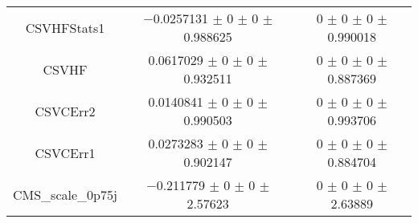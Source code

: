 \begin{table}
\begin{tabular}{ccc}
CSVHFStats1 & \num{-0.0257131} $\pm$ \num{0} $\pm$ \num{0} $\pm$ \num{0.988625} & \num{0} $\pm$ \num{0} $\pm$ \num{0} $\pm$ \num{0.990018}\\
CSVHF & \num{0.0617029} $\pm$ \num{0} $\pm$ \num{0} $\pm$ \num{0.932511} & \num{0} $\pm$ \num{0} $\pm$ \num{0} $\pm$ \num{0.887369}\\
CSVCErr2 & \num{0.0140841} $\pm$ \num{0} $\pm$ \num{0} $\pm$ \num{0.990503} & \num{0} $\pm$ \num{0} $\pm$ \num{0} $\pm$ \num{0.993706}\\
CSVCErr1 & \num{0.0273283} $\pm$ \num{0} $\pm$ \num{0} $\pm$ \num{0.902147} & \num{0} $\pm$ \num{0} $\pm$ \num{0} $\pm$ \num{0.884704}\\
CMS\_scale\_0p75j & \num{-0.211779} $\pm$ \num{0} $\pm$ \num{0} $\pm$ \num{2.57623} & \num{0} $\pm$ \num{0} $\pm$ \num{0} $\pm$ \num{2.63889}\\
\bottomrule
\end{tabular}
\end{table}